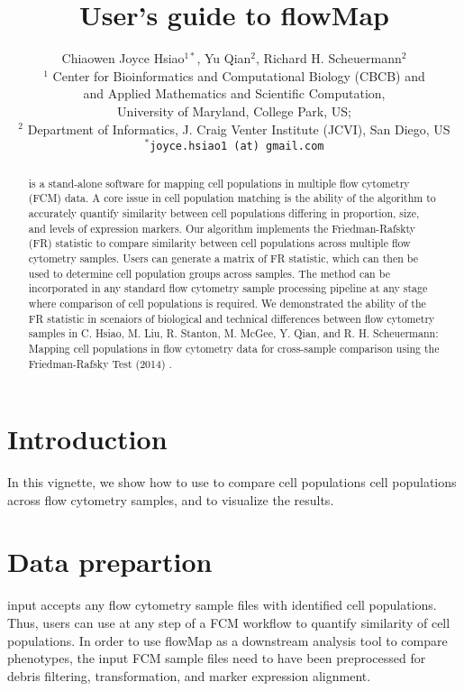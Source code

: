 \documentclass[12pt]{article}\usepackage[]{graphicx}\usepackage[usenames,dvipsnames]{color}
\author{Chiaowen Joyce Hsiao$^{1*}$, Yu Qian$^{2}$, Richard H. Scheuermann$^{2}$ \\[1em] \small{$^{1}$ Center for Bioinformatics and Computational Biology (CBCB) and} \\ \small{and Applied Mathematics and Scientific Computation,} \\ \small{University of Maryland, College Park, US;} \\ \small{$^{2}$ Department of Informatics, J. Craig Venter Institute (JCVI), San Diego, US} \\ \small{\texttt{$^*$joyce.hsiao1 (at) gmail.com}} }
\title{User's guide to flowMap}
\begin{document}
\maketitle

\begin{abstract}
   is a stand-alone software for mapping cell populations in multiple flow cytometry (FCM) data. A core issue in cell population matching is the ability of the algorithm to accurately quantify similarity between cell populations differing in proportion, size, and levels of expression markers. Our algorithm implements the Friedman-Rafskty (FR) statistic to compare similarity between cell populations across multiple flow cytometry samples. Users can generate a matrix of FR statistic, which can then be used to determine cell population groups across samples. The method can be incorporated in any standard flow cytometry sample processing pipeline at any stage where comparison of cell populations is required. We demonstrated the ability of the FR statistic in scenaiors of biological and technical differences between flow cytometry samples in C. Hsiao, M. Liu, R. Stanton, M. McGee, Y. Qian, and R. H. Scheuermann: Mapping cell populations in flow cytometry data for cross-sample comparison using the Friedman-Rafsky Test (2014) \cite{flowMap}. 
\end{abstract}




\newpage

\tableofcontents


\section{Introduction}
In this vignette, we show how to use  to compare cell populations cell populations across flow cytometry samples, and to visualize the results. 

\section{Data prepartion}
 input accepts any flow cytometry sample files with identified cell populations. Thus, users can use  at any step of a FCM workflow to quantify similarity of cell populations. In order to use flowMap as a downstream analysis tool to compare phenotypes, the input FCM sample files need to have been preprocessed for debris filtering, transformation, and marker expression alignment.\\ 
\end{document}
